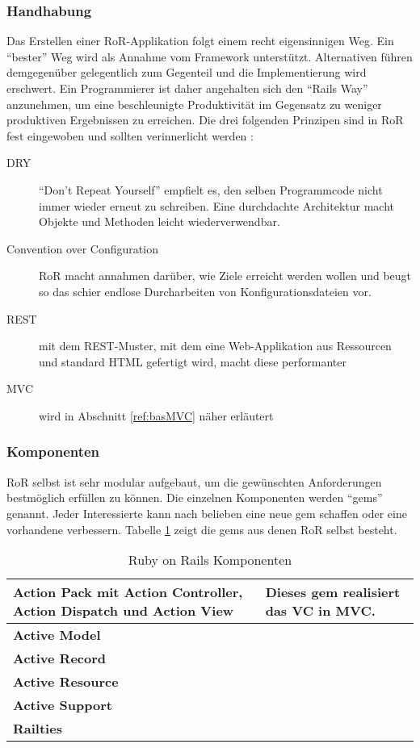 \subsubsection{Handhabung}
Das Erstellen einer RoR-Applikation folgt einem recht eigensinnigen Weg. Ein
"`bester"' Weg wird als Annahme vom Framework unterstützt. Alternativen führen
demgegenüber gelegentlich zum Gegenteil und die Implementierung wird erschwert.
Ein Programmierer ist daher angehalten sich den "`Rails Way"' anzunehmen, um
eine beschleunigte Produktivität im Gegensatz zu weniger produktiven
Ergebnissen zu erreichen. Die drei folgenden Prinzipen sind in RoR fest
eingewoben und sollten verinnerlicht werden \cite{railsGuides:2013}:
\begin{description}
\item[DRY] "`Don't Repeat Yourself"' empfielt es, den selben Programmcode nicht
immer wieder erneut zu schreiben. Eine durchdachte Architektur macht Objekte und
Methoden leicht wiederverwendbar.
\item[Convention over Configuration] RoR macht annahmen darüber, wie Ziele
erreicht werden wollen und beugt so das schier endlose Durcharbeiten von
Konfigurationsdateien vor.
\item[REST] mit dem REST-Muster, mit dem eine Web-Applikation aus Ressourcen und
standard HTML gefertigt wird, macht diese performanter
\item[MVC] wird in Abschnitt \ref{ref:basMVC} näher erläutert
\end{description}

\subsubsection{Komponenten}\label{ref:baseGem}
RoR selbst ist sehr modular aufgebaut, um die gewünschten Anforderungen
bestmöglich erfüllen zu können. Die einzelnen Komponenten werden "`gems"'
genannt. Jeder Interessierte kann nach belieben eine neue gem schaffen oder eine
vorhandene verbessern. Tabelle \ref{ref:tabRoRComp} zeigt die gems aus denen RoR
selbst besteht.

\begin{table}[ht]
\centering
\caption{Ruby on Rails Komponenten\footnotemark}\label{ref:tabRoRComp}
\begin{tabular}{|p{5cm}|p{10cm}|}\hline
\textbf{Action Pack} mit Action Controller, Action Dispatch und Action
View&Dieses gem realisiert das VC in MVC.\\\hline
\textbf{Active Model}&\\\hline
\textbf{Active Record}&\\\hline
\textbf{Active Resource}&\\\hline
\textbf{Active Support}&\\\hline
\textbf{Railties}&\\\hline
\end{tabular}
\end{table}

